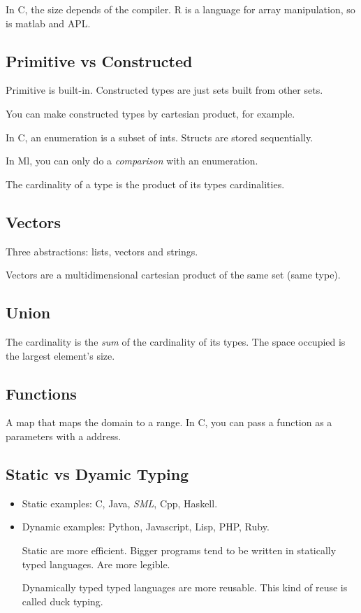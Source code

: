 \documentclass[11pt]{article}
\begin{document}
In C, the size depends of the compiler. R is a language for array manipulation, so is
matlab and APL.


\subsection{Primitive vs Constructed}
\label{sec:orgb1b7c53}
Primitive is built-in. Constructed types are just sets built from other sets.

You can make constructed types by cartesian product, for example.

In C, an enumeration is a subset of ints. Structs are stored sequentially.

In Ml, you can only do a \emph{comparison} with an enumeration.

The cardinality of a type is the product of its types cardinalities.

\subsection{Vectors}
\label{sec:orgf085f89}
Three abstractions: lists, vectors and strings.

Vectors are a multidimensional cartesian product of the same set (same type).

\subsection{Union}
\label{sec:orgf7b38d9}
The cardinality is the \emph{sum} of the cardinality of its types. The space occupied is the
largest element's size.
\subsection{Functions}
\label{sec:org4ccae4f}
A map that maps the domain to a range. In C, you can pass a function as a parameters
with a address.
\subsection{Static vs Dyamic Typing}
\label{sec:orge353561}
\begin{itemize}
\item Static examples: C, Java, \emph{SML}, Cpp, Haskell.
\item Dynamic examples: Python, Javascript, Lisp, PHP, Ruby.

Static are more efficient. Bigger programs tend to be written in statically typed
languages. Are more legible.

Dynamically typed typed languages are more reusable. This kind of reuse is called
duck typing.
\end{itemize}
\end{document}
